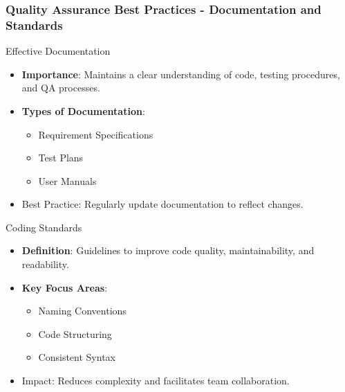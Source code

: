 \documentclass{beamer}
\begin{document}
\begin{frame}[fragile]
    \frametitle{Quality Assurance Best Practices - Documentation and Standards}
    \begin{block}{Effective Documentation}
        \begin{itemize}
            \item \textbf{Importance}: Maintains a clear understanding of code, testing procedures, and QA processes.
            \item \textbf{Types of Documentation}:
            \begin{itemize}
                \item Requirement Specifications
                \item Test Plans
                \item User Manuals
            \end{itemize}
            \item Best Practice: Regularly update documentation to reflect changes.
        \end{itemize}
    \end{block}
    
    \begin{block}{Coding Standards}
        \begin{itemize}
            \item \textbf{Definition}: Guidelines to improve code quality, maintainability, and readability.
            \item \textbf{Key Focus Areas}:
            \begin{itemize}
                \item Naming Conventions
                \item Code Structuring
                \item Consistent Syntax
            \end{itemize}
            \item Impact: Reduces complexity and facilitates team collaboration.
        \end{itemize}
    \end{block}
\end{frame}
\end{document}
